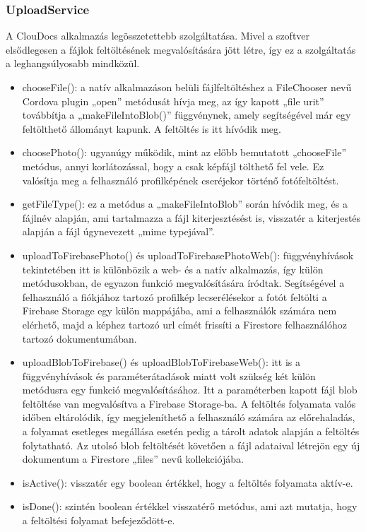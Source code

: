 \documentclass[12pt, twoside]{report}
\begin{document}
\subsubsection{UploadService}
A ClouDocs alkalmazás legösszetettebb szolgáltatása. Mivel a szoftver elsődlegesen a fájlok feltöltésének megvalósítására jött létre, így ez a szolgáltatás a leghangsúlyosabb mindközül.

\begin{itemize}
	\item chooseFile(): a natív alkalmazáson belüli fájlfeltöltéshez a FileChooser nevű Cordova plugin „open” metódusát hívja meg, az így kapott „file urit” továbbítja a „makeFileIntoBlob()” függvénynek, amely segítségével már egy feltölthető állományt kapunk. A feltöltés is itt hívódik meg.
	\item choosePhoto(): ugyanúgy működik, mint az előbb bemutatott  „chooseFile” metódus, annyi korlátozással, hogy a csak képfájl tölthető fel vele. Ez valósítja meg a felhasználó profilképének cseréjekor történő fotófeltöltést.
	\item  getFileType(): ez a metódus a „makeFileIntoBlob” során hívódik meg, és a fájlnév alapján, ami tartalmazza a fájl kiterjesztésést is, visszatér a kiterjestés alapján a fájl úgynevezett „mime typejával”.
	\item  uploadToFirebasePhoto() és uploadToFirebasePhotoWeb(): függvényhívások tekintetében itt is különbözik a web- és a natív alkalmazás, így külön metódusokban, de egyazon funkció megvalósítására íródtak. Segítségével a felhasználó a fiókjához tartozó profilkép lecserélésekor a fotót feltölti a Firebase Storage egy külön mappájába, ami a felhasználók számára nem elérhető, majd a képhez tartozó url címét frissíti a Firestore felhasználóhoz tartozó dokumentumában.
	\item 	uploadBlobToFirebase() és uploadBlobToFirebaseWeb(): itt is a függvényhívások és paraméterátadások miatt volt szükség két külön metódusra egy funkció megvalósításához. Itt a paraméterben kapott fájl blob feltöltése van megvalósítva a Firebase Storage-ba. A feltöltés folyamata valós időben eltárolódik, így megjeleníthető a felhasználó számára az előrehaladás, a folyamat esetleges megállása esetén pedig a tárolt adatok alapján a feltöltés folytatható. Az utolsó blob feltöltését követően a fájl adataival létrejön egy új dokumentum a Firestore „files” nevű kollekciójába.
	\item isActive(): visszatér egy boolean értékkel, hogy a feltöltés folyamata aktív-e.
	\item isDone(): szintén boolean értékkel visszatérő metódus, ami azt mutatja, hogy a feltöltési folyamat befejeződött-e.
\end{itemize}
\end{document}
